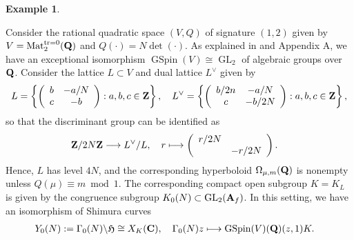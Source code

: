 \documentclass{amsart}
\theoremstyle{definition}
\theoremstyle{definition}
\newtheorem{example}[theorem]{Example}
\theoremstyle{definition}
\begin{document}
\begin{example}\label{KSAVn=1} 

Consider the rational quadratic space $(V,Q)$ of signature $(1,2)$ 
given by $V = \operatorname{Mat}_2^{\operatorname{tr} = 0}({\bf{Q}})$ and $Q(\cdot) = N \det(\cdot)$. 
As explained in \cite[$\S$7.3]{BY} and Appendix A, we have an exceptional isomorphism
$\operatorname{GSpin}(V) \cong \operatorname{GL}_2$ of algebraic groups over ${\bf{Q}}$.
Consider the lattice $L \subset V$ and dual lattice $L^{\vee}$ given by
\begin{align*} L = \left\lbrace \left( \begin{array}{cc} b & -a/N \\ c & -b \end{array} \right) : a,b,c \in {\bf{Z}} \right\rbrace,
\quad L^{\vee} = \left\lbrace \left( \begin{array}{cc} b/2n & -a/N \\ c & -b/2N \end{array} \right) : a,b,c \in {\bf{Z}} \right\rbrace, \end{align*}
so that the discriminant group can be identified as 
\begin{align*} {\bf{Z}}/2N {\bf{Z}} &\longrightarrow L^{\vee}/L, \quad r \longmapsto \left( \begin{array}{cc} r/2N & ~\\~&-r/2N \end{array} \right). \end{align*}
Hence, $L$ has level $4N$, and the corresponding hyperboloid $\Omega_{\mu, m}({\bf{Q}})$
is nonempty unless $Q(\mu) \equiv m \bmod 1$. The corresponding compact open subgroup $K = K_L$ is given by the congruence subgroup $K_0(N) \subset \operatorname{GL}_2({\bf{A}}_f)$.
In this setting, we have an isomorphism of Shimura curves 
\begin{align*} Y_0(N) := \Gamma_0(N) \backslash \mathfrak{H} &\cong X_K({\bf{C}}), 
\quad \Gamma_0(N) z \longmapsto \operatorname{GSpin}(V)({\bf{Q}})(z,1) K. \end{align*}

\end{example}
\end{document}
